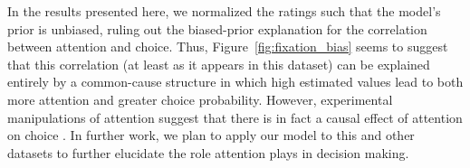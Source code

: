 \documentclass[12pt,a4paperpaper,]{article}
\begin{document}
In the results presented here, we normalized the ratings such that the model's prior is unbiased, ruling out the biased-prior explanation for the correlation between attention and choice. Thus, Figure~\ref{fig:fixation_bias} seems to suggest that this correlation (at least as it appears in this dataset) can be explained entirely by a common-cause structure in which high estimated values lead to both more attention and greater choice probability. However, experimental manipulations of attention suggest that there is in fact a causal effect of attention on choice \citep{Tavares2017}. In further work, we plan to apply our model to this and other datasets to further elucidate the role attention plays in decision making.




\end{document}
